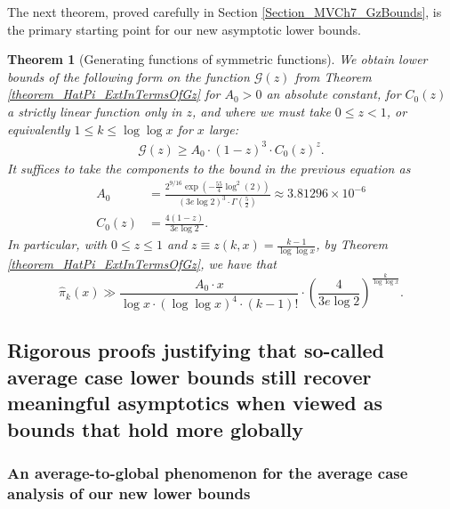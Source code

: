 \documentclass[11pt,reqno,a4letter]{article}
\numberwithin{figure}{section}
\numberwithin{table}{section}
\theoremstyle{plain}
\newtheorem{theorem}{Theorem}
\numberwithin{theorem}{section}
\theoremstyle{definition}
\newcommand{\SuccSim}[0]{\overset{_{\scriptsize{\blacktriangle}}}{\succsim}}
\renewcommand{\SuccSim}[0]{\ensuremath{\gg}}
\begin{document}
The next theorem, proved carefully in Section \ref{Section_MVCh7_GzBounds}, 
is the primary starting point for our new asymptotic lower bounds. 

\begin{theorem}[Generating functions of symmetric functions] 
\label{theorem_GFs_SymmFuncs_SumsOfRecipOfPowsOfPrimes} 
\label{cor_BoundsOnGz_FromMVBook_initial_stmt_v1} 
We obtain lower bounds of the following form on the function 
$\mathcal{G}(z)$ from Theorem \ref{theorem_HatPi_ExtInTermsOfGz} 
for $A_0 > 0$ an absolute constant, for 
$C_0(z)$ a strictly linear function only in $z$, and 
where we must take $0 \leq z < 1$, or equivalently $1 \leq k \leq \log\log x$ for $x$ large: 
\begin{align*} 
\mathcal{G}(z) \geq A_0 \cdot (1-z)^{3} \cdot C_0(z)^{z}. 
\end{align*} 
It suffices to take the components to the bound in the previous equation as 
\begin{align*}
A_0 & = \frac{2^{9/16} \exp\left(-\frac{55}{4} \log^2(2)\right)}{ 
     (3e\log 2)^3 \cdot \Gamma\left(\frac{5}{2}\right)} \approx 3.81296 \times 10^{-6} \\ 
C_0(z) & = \frac{4(1-z)}{3e \log 2}. 
\end{align*} 
In particular, with $0 \leq z \leq 1$ and 
$z \equiv z(k, x) = \frac{k-1}{\log\log x}$, by Theorem \ref{theorem_HatPi_ExtInTermsOfGz}, 
we have that 
\[
\widehat{\pi}_k(x) \SuccSim \frac{A_0 \cdot x}{\log x \cdot (\log\log x)^4 \cdot (k-1)!} \cdot 
     \left(\frac{4}{3e\log 2}\right)^{\frac{k}{\log\log x}}.
\]
\end{theorem} 

\subsection{Rigorous proofs justifying that so-called average case lower bounds still recover 
            meaningful asymptotics when viewed as bounds that hold more globally} 
\label{subSection_Intro_RigorToTheAverageCaseEstimates} 

\subsubsection{An average-to-global phenomenon for the average case analysis of our new lower bounds} 
\end{document}
